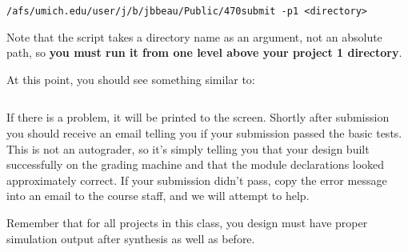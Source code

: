 \documentclass{article}
\begin{document}
\texttt{/afs/umich.edu/user/j/b/jbbeau/Public/470submit -p1 <directory>}

\noindent
Note that the script takes a directory name as an argument, not an absolute
path, so \textbf{you must run it from one level above your project 1 directory}. 

At this point, you should see something similar to: 
\inputminted[frame=lines,obeytabs,tabsize=4]{bash}{submission.txt}
\noindent
If there is a problem, it will be printed to the screen. Shortly after
submission you should receive an email telling you if your submission passed the
basic tests. This is not an autograder, so it's simply telling you that your
design built successfully on the grading machine and that the module
declarations looked approximately correct. If your submission didn't pass, copy
the error message into an email to the course staff, and we will attempt to
help.

Remember that for all projects in this class, you design must have proper simulation output after synthesis as well as before.
\end{document}
